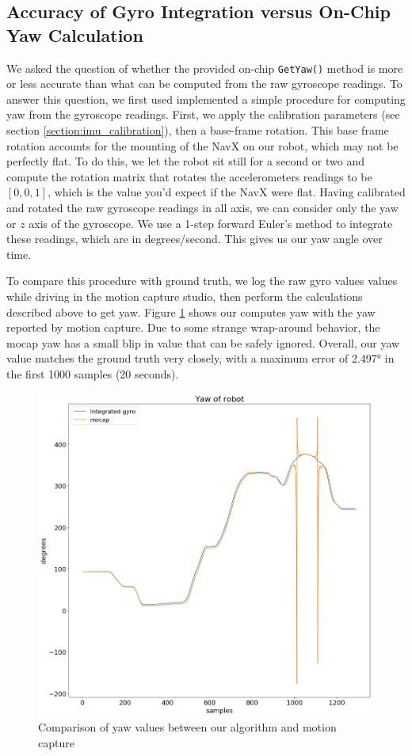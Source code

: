 \documentclass{article}
\begin{document}
  \subsection{Accuracy of Gyro Integration versus On-Chip Yaw Calculation}

    We asked the question of whether the provided on-chip \texttt{GetYaw()} method is more or less accurate than what can be computed from the raw gyroscope readings. To answer this question, we first used implemented a simple procedure for computing yaw from the gyroscope readings. First, we apply the calibration parameters (see section \ref{section:imu_calibration}), then a base-frame rotation. This base frame rotation accounts for the mounting of the NavX on our robot, which may not be perfectly flat. To do this, we let the robot sit still for a second or two and compute the rotation matrix that rotates the accelerometers readings to be $[0,0,1]$, which is the value you'd expect if the NavX were flat. Having calibrated and rotated the raw gyroscope readings in all axis, we can consider only the yaw or $z$ axis of the gyroscope. We use a 1-step forward Euler's method to integrate these readings, which are in degrees/second. This gives us our yaw angle over time.

    To compare this procedure with ground truth, we log the raw gyro values values while driving in the motion capture studio, then perform the calculations described above to get yaw. Figure \ref{fig:yaw_comparison} shows our computes yaw with the yaw reported by motion capture. Due to some strange wrap-around behavior, the mocap yaw has a small blip in value that can be safely ignored. Overall, our yaw value matches the ground truth very closely, with a maximum error of \ang{2.497} in the first 1000 samples (20 seconds).

    \begin{figure}[H]
      \centering
      \includegraphics[width=0.75\linewidth]{./images/yaw_mocap_versus_integration.png}
      \caption{Comparison of yaw values between our algorithm and motion capture}
      \label{fig:yaw_comparison}
    \end{figure}
\end{document}
